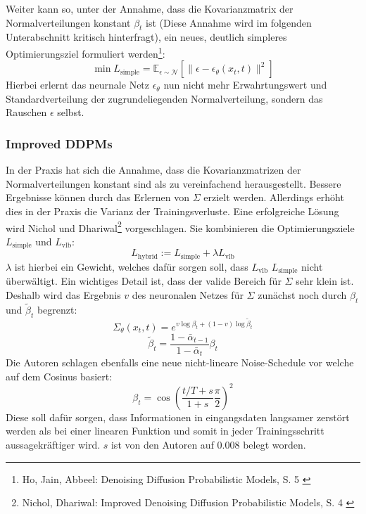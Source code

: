 Weiter kann so, unter der Annahme, dass die Kovarianzmatrix der Normalverteilungen konstant $\beta_t$ ist (Diese Annahme wird im folgenden Unterabschnitt kritisch hinterfragt), ein neues, deutlich simpleres Optimierungsziel formuliert werden\footnote{
    Ho, Jain, Abbeel: Denoising Diffusion Probabilistic Models, S. 5
    \cite{ho2020denoisingdiffusionprobabilisticmodels}
}: 
\begin{equation}
    \min L_\text{simple} = \mathbb E_{\epsilon \sim \mathcal N}
    \left [
        \| \epsilon - \epsilon_\theta(x_{t}, t) \|^2
    \right ]
\end{equation}
Hierbei erlernt das neurnale Netz $\epsilon_\theta$ nun nicht mehr Erwahrtungswert und Standardverteilung der zugrundeliegenden Normalverteilung, sondern das Rauschen $\epsilon$ selbst. 

\subsubsection{Improved DDPMs}

In der Praxis hat sich die Annahme, dass die Kovarianzmatrizen der Normalverteilungen konstant sind als zu vereinfachend herausgestellt. Bessere Ergebnisse können durch das Erlernen von $\Sigma$ erzielt werden. Allerdings erhöht dies in der Praxis die Varianz der Trainingsverluste. Eine erfolgreiche Lösung wird Nichol und Dhariwal\footnote{
    Nichol, Dhariwal: Improved Denoising Diffusion Probabilistic Models, S. 4
    \cite{nichol2021improveddenoisingdiffusionprobabilistic}
} vorgeschlagen. Sie kombinieren die Optimierungsziele $L_\text{simple}$ und $L_\text{vlb}$:
\begin{equation}
    L_\text{hybrid} := L_\text{simple} + \lambda L_\text{vlb}
\end{equation}
$\lambda$ ist hierbei ein Gewicht, welches dafür sorgen soll, dass $L_\text{vlb}$ $L_\text{simple}$ nicht überwältigt. Ein wichtiges Detail ist, dass der valide Bereich für $\Sigma$ sehr klein ist. Deshalb wird das Ergebnis $v$ des neuronalen Netzes für $\Sigma$ zunächst noch durch $\beta_t$ und $\tilde \beta_t$ begrenzt:
\begin{equation}
    \Sigma_\theta(x_t, t) = e^{v \log \beta_t + (1 - v) \log \tilde \beta_t}
\end{equation}
\begin{equation}
    \tilde \beta_t = \frac{1-\bar \alpha_{t-1}} {1-\bar \alpha_{t}} \beta_t
\end{equation}
Die Autoren schlagen ebenfalls eine neue nicht-lineare Noise-Schedule vor welche auf dem Cosinus basiert: 
\begin{equation}
    \beta_t = \cos \left ( 
        \frac{t/T+s}{1+s} \frac{\pi}{2}
    \right )^2
\end{equation}
Diese soll dafür sorgen, dass Informationen in eingangsdaten langsamer zerstört werden als bei einer linearen Funktion und somit in jeder Trainingsschritt aussagekräftiger wird. $s$ ist von den Autoren auf 0.008 belegt worden.

